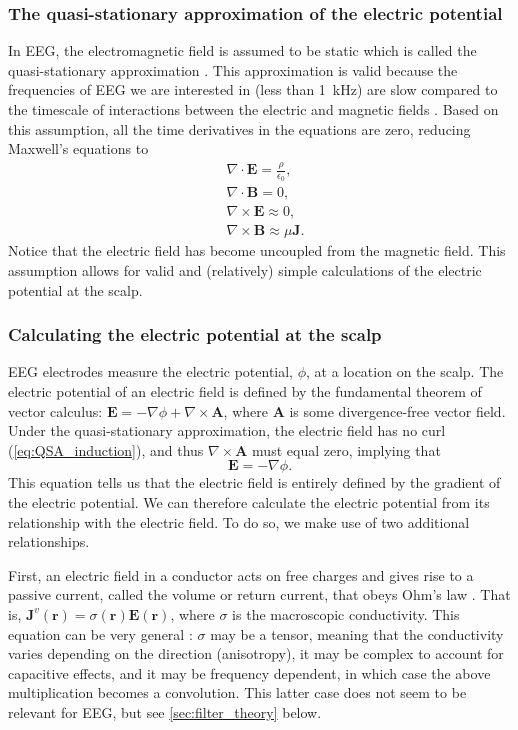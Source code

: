 \subsubsection{The quasi-stationary approximation of the electric potential}
In EEG, the electromagnetic field is assumed to be static which is called the quasi-stationary approximation \cite{Plonsey1967}. This approximation is valid because the frequencies of EEG we are interested in (less than \qty{1}{\kilo\hertz}) are slow compared to the timescale of interactions between the electric and magnetic fields \cite{RevModPhys.65.413}. Based on this assumption, all the time derivatives in the equations are zero, reducing Maxwell's equations to
\begin{align}
    & \nabla \cdot \bm{E} = \frac{\rho}{\epsilon_0}\mathrm{,} \\
    & \nabla \cdot \bm{B} = 0\mathrm{,} \\ 
    & \nabla \times \bm{E} \approx 0\mathrm{,} \label{eq:QSA_induction} \\ 
    & \nabla \times \bm{B} \approx \mu \bm{J}\mathrm{.} \label{eq:QSA_amp_law}
\end{align}
Notice that the electric field has become uncoupled from the magnetic field. This assumption allows for valid and (relatively) simple calculations of the electric potential at the scalp.

\subsubsection{Calculating the electric potential at the scalp}
EEG electrodes measure the electric potential, $\phi$, at a location on the scalp. The electric potential of an electric field is defined by the fundamental theorem of vector calculus: $\bm{E} = - \nabla \phi + \nabla \times \bm{A}$, where $\bm{A}$ is some divergence-free vector field. Under the quasi-stationary approximation, the electric field has no curl (\ref{eq:QSA_induction}), and thus $\nabla \times \bm{A}$ must equal zero, implying that 
\begin{equation} \label{eq:potential}
\bm{E} = -\nabla \phi\mathrm{.}
\end{equation}
This equation tells us that the electric field is entirely defined by the gradient of the electric potential. We can therefore calculate the electric potential from its relationship with the electric field. To do so, we make use of two additional relationships.

First, an electric field in a conductor acts on free charges and gives rise to a passive current, called the volume or return current, that obeys Ohm's law  \cite{RevModPhys.65.413}. That is, $\bm{J}^{v}(\bm{r}) = \sigma(\bm{r}) \bm{E}(\bm{r})$, where $\sigma$ is the macroscopic conductivity. This equation can be very general \cite{Pettersen2012}: $\sigma$ may be a tensor, meaning that the conductivity varies depending on the direction (anisotropy), it may be complex to account for capacitive effects, and it may be frequency dependent, in which case the above multiplication becomes a convolution. This latter case does not seem to be relevant for EEG, but see \autoref{sec:filter_theory} below.

